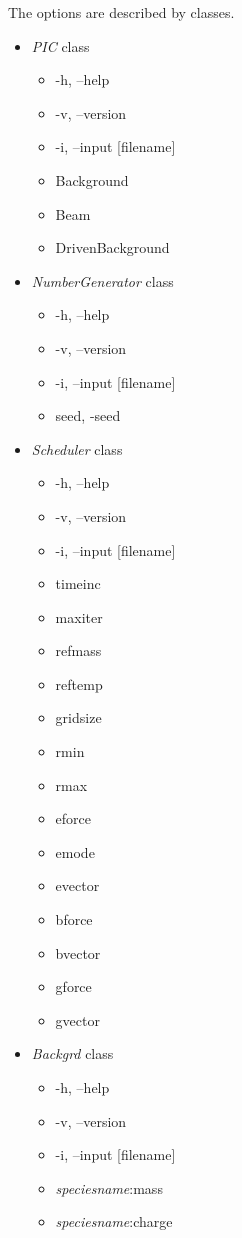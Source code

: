 \documentclass[10pt,a4paper]{article}
\begin{document}
The options are described by classes.
\begin{itemize}
\item \emph{PIC} class
	\begin{itemize}
	\item -h, --help
	\item -v, --version
	\item -i, --input [filename]
	\item Background
	\item Beam
	\item DrivenBackground
	\end{itemize}
\item \emph{NumberGenerator} class
	\begin{itemize}
	\item -h, --help
	\item -v, --version
	\item -i, --input [filename]
	\item seed, -seed
	\end{itemize}
\item \emph{Scheduler} class
	\begin{itemize}
	\item -h, --help
	\item -v, --version
	\item -i, --input [filename]
	\item timeinc 
	\item maxiter
	\item refmass
	\item reftemp
	\item gridsize
	\item rmin
	\item rmax
	\item eforce
	\item emode
	\item evector
	\item bforce
	\item bvector
	\item gforce
	\item gvector
	\end{itemize}
\item \emph{Backgrd} class
	\begin{itemize}
	\item -h, --help
	\item -v, --version
	\item -i, --input [filename]
	\item \emph{speciesname}:mass	
	\item \emph{speciesname}:charge	

\end{itemize}
\end{itemize}
\end{document}
